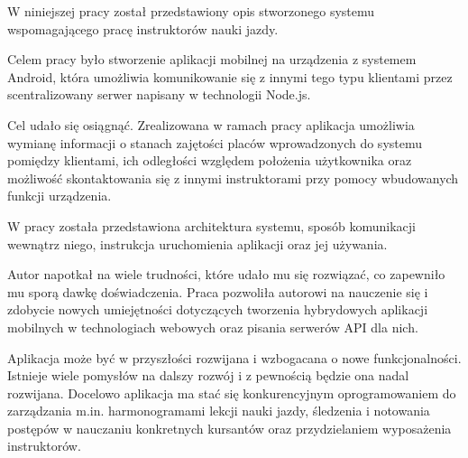 \documentclass[twoside,a4paper,openright,12pt]{book}
\begin{document}
W niniejszej pracy został przedstawiony opis stworzonego systemu wspomagającego pracę instruktorów nauki jazdy.

Celem pracy było stworzenie aplikacji mobilnej na urządzenia z systemem Android, która umożliwia komunikowanie się z innymi tego typu klientami przez scentralizowany serwer napisany w technologii Node.js.

Cel udało się osiągnąć. Zrealizowana w ramach pracy aplikacja umożliwia wymianę informacji o stanach zajętości placów wprowadzonych do systemu pomiędzy klientami, ich odległości względem położenia użytkownika oraz możliwość skontaktowania się z innymi instruktorami przy pomocy wbudowanych funkcji urządzenia.

W pracy została przedstawiona architektura systemu, sposób komunikacji wewnątrz niego, instrukcja uruchomienia aplikacji oraz jej używania.

Autor napotkał na wiele trudności, które udało mu się rozwiązać, co zapewniło mu sporą dawkę doświadczenia. Praca pozwoliła autorowi na nauczenie się i zdobycie nowych umiejętności dotyczących tworzenia hybrydowych aplikacji mobilnych w technologiach webowych oraz pisania serwerów API dla nich.

Aplikacja może być w przyszłości rozwijana i wzbogacana o nowe funkcjonalności. Istnieje wiele pomysłów na dalszy rozwój i z pewnością będzie ona nadal rozwijana. Docelowo aplikacja ma stać się konkurencyjnym oprogramowaniem do zarządzania m.in. harmonogramami lekcji nauki jazdy, śledzenia i notowania postępów w nauczaniu konkretnych kursantów oraz przydzielaniem wyposażenia instruktorów.

\backmatter

\listoffigures
\lstlistoflistings

\nocite{*}

\renewcommand{\bibname}{Literatura}

\end{document}
